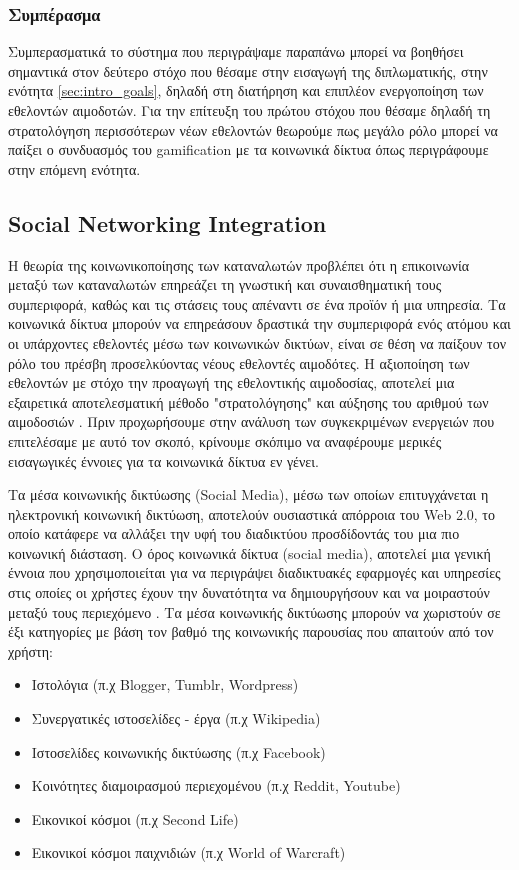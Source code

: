 	\subsubsection{Συμπέρασμα}
	
	Συμπερασματικά το σύστημα που περιγράψαμε παραπάνω μπορεί να βοηθήσει σημαντικά στον δεύτερο στόχο που θέσαμε στην εισαγωγή της διπλωματικής, στην ενότητα \ref{sec:intro_goals}, δηλαδή στη διατήρηση και επιπλέον ενεργοποίηση των εθελοντών αιμοδοτών. Για την επίτευξη του πρώτου στόχου που θέσαμε δηλαδή τη στρατολόγηση περισσότερων νέων εθελοντών θεωρούμε πως μεγάλο ρόλο μπορεί να παίξει ο συνδυασμός του gamification με τα κοινωνικά δίκτυα όπως περιγράφουμε στην επόμενη ενότητα.
	
	\subsection{Social Networking Integration}\label{ssec:social_netowrks_system_analysis}

	Η θεωρία της κοινωνικοποίησης των καταναλωτών προβλέπει ότι η επικοινωνία μεταξύ των καταναλωτών επηρεάζει τη γνωστική και συναισθηματική τους συμπεριφορά, καθώς και τις στάσεις τους απέναντι σε ένα προϊόν ή μια υπηρεσία\cite{1974}. Τα κοινωνικά δίκτυα μπορούν να επηρεάσουν δραστικά την συμπεριφορά ενός ατόμου\cite{shaver2007impact} και οι υπάρχοντες εθελοντές μέσω των κοινωνικών δικτύων, είναι σε θέση να παίξουν τον ρόλο του πρέσβη προσελκύοντας νέους εθελοντές αιμοδότες. Η αξιοποίηση των εθελοντών με στόχο την προαγωγή της εθελοντικής αιμοδοσίας, αποτελεί μια εξαιρετικά αποτελεσματική μέθοδο "στρατολόγησης" και αύξησης του αριθμού των αιμοδοσιών \cite{Lemmens2008}. Πριν προχωρήσουμε στην ανάλυση των συγκεκριμένων ενεργειών που επιτελέσαμε με αυτό τον σκοπό, κρίνουμε σκόπιμο να αναφέρουμε μερικές εισαγωγικές έννοιες για τα κοινωνικά δίκτυα εν γένει. 	
	
	Τα μέσα κοινωνικής δικτύωσης (Social Media), μέσω των οποίων επιτυγχάνεται η ηλεκτρονική κοινωνική δικτύωση, αποτελούν ουσιαστικά απόρροια του Web 2.0, το οποίο κατάφερε να αλλάξει την υφή του διαδικτύου προσδίδοντάς του μια πιο κοινωνική διάσταση. Ο όρος κοινωνικά δίκτυα (social media), αποτελεί μια γενική έννοια που χρησιμοποιείται για να περιγράψει διαδικτυακές εφαρμογές και υπηρεσίες στις οποίες οι χρήστες έχουν την δυνατότητα να δημιουργήσουν και να μοιραστούν μεταξύ τους περιεχόμενο \cite{Kaplan201059}. Τα μέσα κοινωνικής δικτύωσης μπορούν να χωριστούν σε έξι κατηγορίες με βάση τον βαθμό της κοινωνικής παρουσίας που απαιτούν από τον χρήστη:
	\begin{itemize}
		\item Ιστολόγια (π.χ Blogger, Tumblr, Wordpress)
		\item Συνεργατικές ιστοσελίδες - έργα (π.χ Wikipedia)
		\item Ιστοσελίδες κοινωνικής δικτύωσης (π.χ Facebook)
		\item Κοινότητες διαμοιρασμού περιεχομένου (π.χ Reddit, Youtube)
		\item Εικονικοί κόσμοι (π.χ Second Life)
		\item Εικονικοί κόσμοι παιχνιδιών (π.χ World of Warcraft)
	\end{itemize}
	
